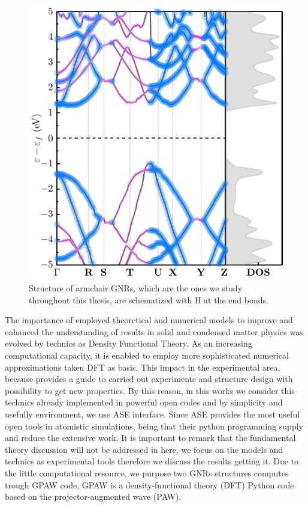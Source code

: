 \begin{figure}[h!]
	\centering
	\includegraphics[width=0.80\linewidth]{FIGURES/Physical_Background/PLOT-GNRS008}
	\caption{Structure of armchair GNRs, which are the ones we study throughout this thesis, are schematized with H at the end bonds. }
	\label{fig:introfig32}
\end{figure}
\vspace{-1cm}


The importance of employed theoretical and numerical models to improve and enhanced the understanding of results in solid and condensed matter physics was evolved by technics as Density Functional Theory. As an increasing computational  capacity, it is enabled to employ more sophisticated numerical approximations taken  DFT as basis. This impact in the experimental area, because provides a guide to carried out experiments and structure design\cite{zangwill2015density} with  possibility to get new properties. By this reason, in this works we consider this technics already implemented  in powerful  open codes and  by simplicity and usefully environment, we use ASE interface\cite{ask2017ase}. Since ASE provides the most useful open tools in atomistic simulations, being that their python programming supply and reduce the extensive work. It is important to remark that the fundamental theory discussion will not be addressed in here, we focus on the models and technics as experimental tools therefore we discuss the results getting it. Due to the little computational resource, we purpose two GNRs  structures computes trough GPAW code\cite{electronic2010enkovaara,real-space2005mortensen}, GPAW is a density-functional theory (DFT) Python code based on the projector-augmented wave (PAW)\cite{rostgaard2006exact,blochlprojector1994}.


